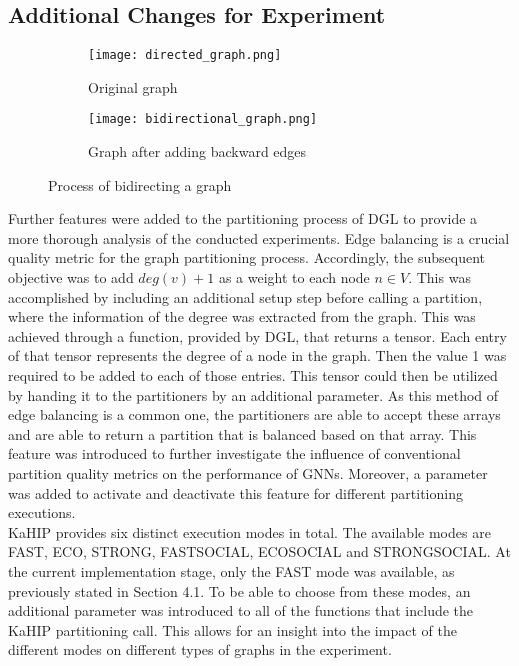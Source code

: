 \documentclass[acmsmall,nonacm,screen,review]{acmart}
\begin{document}
\subsection{Additional Changes for Experiment}
\begin{figure}[bt!]
     \centering
     \begin{subfigure}[b]{0.45\textwidth}
         \centering
         \texttt{[image: directed\_graph.png]}
         \caption{Original graph}
         \label{uni}
     \end{subfigure}
     \hfill
     \begin{subfigure}[b]{0.45\textwidth}
         \centering
         \texttt{[image: bidirectional\_graph.png]}
         \caption{Graph after adding backward edges}
         \label{bi}
     \end{subfigure}
     \caption{Process of bidirecting a graph}
     \label{bidirecting}
\end{figure}
Further features were added to the partitioning process of DGL to provide a more thorough analysis of the conducted experiments. Edge balancing is a crucial quality metric for the graph partitioning process. Accordingly, the subsequent objective was to add $deg(v) + 1$ as a weight to each node $n \in V$. This was accomplished by including an additional setup step before calling a partition, where the information of the degree was extracted from the graph. This was achieved through a function, provided by DGL, that returns a tensor. Each entry of that tensor represents the degree of a node in the graph. Then the value 1 was required to be added to each of those entries. This tensor could then be utilized by handing it to the partitioners by an additional parameter. As this method of edge balancing is a common one, the partitioners are able to accept these arrays and are able to return a partition that is balanced based on that array. This feature was introduced to further investigate the influence of conventional partition quality metrics on the performance of GNNs. Moreover, a parameter was added to activate and deactivate this feature for different partitioning executions.  \\
KaHIP provides six distinct execution modes in total. The available modes are FAST, ECO, STRONG, FASTSOCIAL, ECOSOCIAL and STRONGSOCIAL. At the current implementation stage, only the FAST mode was available, as previously stated in Section 4.1. To be able to choose from these modes, an additional parameter was introduced to all of the functions that include the KaHIP partitioning call. This allows for an insight into the impact of the different modes on different types of graphs in the experiment.
\end{document}
